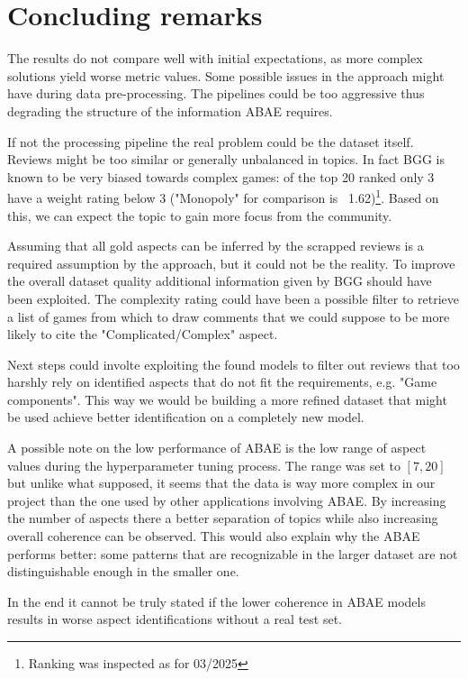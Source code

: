 \section{Concluding remarks}
The results do not compare well with initial expectations, as more complex solutions yield worse metric values.
Some possible issues in the approach might have during data pre-processing.
The pipelines could be too aggressive thus degrading the structure of the information ABAE requires.

If not the processing pipeline the real problem could be the dataset itself.
Reviews might be too similar or generally unbalanced in topics.
In fact BGG is known to be very biased towards complex games: of the top 20 ranked
only 3 have a weight rating below 3 ("Monopoly" for comparison is ~1.62)\footnote{Ranking was inspected as for 03/2025}.
Based on this, we can expect the topic to gain more focus from the community.

Assuming that all gold aspects can be inferred by the scrapped reviews
is a required assumption by the approach, but it could not be the reality.
To improve the overall dataset quality additional information given by BGG should have been exploited.
The complexity rating could have been a possible filter to retrieve a list of games from which to draw
comments that we could suppose to be more likely to cite the "Complicated/Complex" aspect.

Next steps could involte exploiting the found models to filter out reviews that too harshly rely
on identified aspects that do not fit the requirements, e.g. "Game components".
This way we would be building a more refined dataset that might be used achieve better identification on a completely new model.

A possible note on the low performance of ABAE is the low range of aspect values
during the hyperparameter tuning process.
The range was set to $[7,20]$ but unlike what supposed, it seems that the data is way more complex in our
project than the one used by other applications involving ABAE.
By increasing the number of aspects there
a better separation of topics while also increasing overall coherence can be observed.
This would also explain why the  ABAE performs better:
some patterns that are recognizable in the larger dataset are not distinguishable enough in the smaller one.

In the end it cannot be truly stated if the lower coherence in ABAE models results
in worse aspect identifications without a real test set.